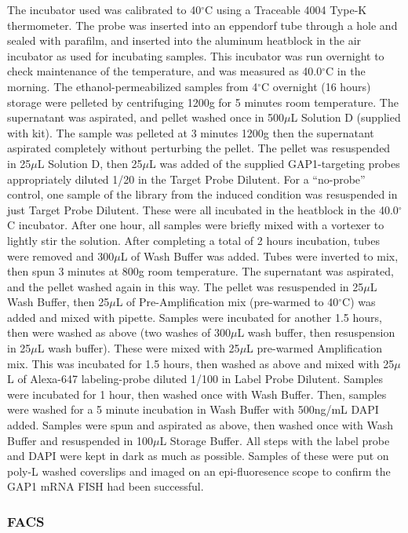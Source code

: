 {The incubator used was calibrated to 40\(^{\circ}\)C using a Traceable
4004 Type-K thermometer. The probe was inserted into an eppendorf tube
through a hole and sealed with parafilm, and inserted into the aluminum
heatblock in the air incubator as used for incubating samples. This
incubator was run overnight to check maintenance of the temperature, and
was measured as 40.0\(^{\circ}\)C in the morning. The
ethanol-permeabilized samples from 4\(^{\circ}\)C overnight (16 hours)
storage were pelleted by centrifuging 1200g for 5 minutes room
temperature. The supernatant was aspirated, and pellet washed once in
500\(\mu\)L Solution D (supplied with kit). The sample was pelleted at 3
minutes 1200g then the supernatant aspirated completely without
perturbing the pellet. The pellet was resuspended in 25\(\mu\)L Solution
D, then 25\(\mu\)L was added of the supplied GAP1-targeting probes
appropriately diluted 1/20 in the Target Probe Dilutent. For a
``no-probe'' control, one sample of the library from the induced
condition was resuspended in just Target Probe Dilutent. These were all
incubated in the heatblock in the 40.0\(^{\circ}\)C incubator. After one
hour, all samples were briefly mixed with a vortexer to lightly stir the
solution. After completing a total of 2 hours incubation, tubes were
removed and 300\(\mu\)L of Wash Buffer was added. Tubes were inverted to
mix, then spun 3 minutes at 800g room temperature. The supernatant was
aspirated, and the pellet washed again in this way. The pellet was
resuspended in 25\(\mu\)L Wash Buffer, then 25\(\mu\)L of
Pre-Amplification mix (pre-warmed to 40\(^{\circ}\)C) was added and
mixed with pipette. Samples were incubated for another 1.5 hours, then
were washed as above (two washes of 300\(\mu\)L wash buffer, then
resuspension in 25\(\mu\)L wash buffer). These were mixed with
25\(\mu\)L pre-warmed Amplification mix. This was incubated for 1.5
hours, then washed as above and mixed with 25\(\mu\)L of Alexa-647
labeling-probe diluted 1/100 in Label Probe Dilutent. Samples were
incubated for 1 hour, then washed once with Wash Buffer. Then, samples
were washed for a 5 minute incubation in Wash Buffer with 500ng/mL DAPI
added. Samples were spun and aspirated as above, then washed once with
Wash Buffer and resuspended in 100\(\mu\)L Storage Buffer. All steps
with the label probe and DAPI were kept in dark as much as possible.
Samples of these were put on poly-L washed coverslips and imaged on an
epi-fluoresence scope to confirm the GAP1 mRNA FISH had been successful.

\subsubsection{FACS}\label{facs}

}
